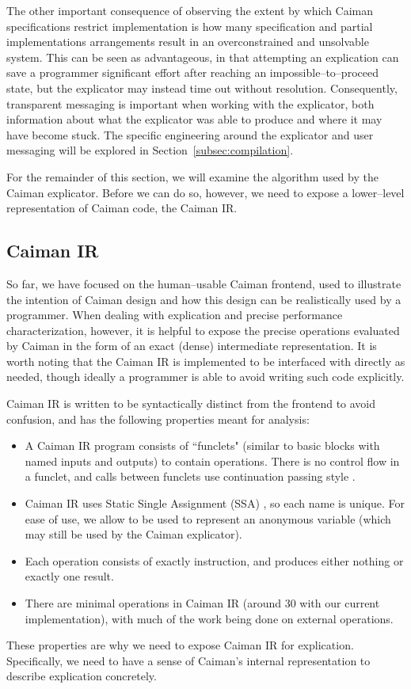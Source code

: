 The other important consequence of observing the extent by which Caiman specifications restrict implementation is how many specification and partial implementations arrangements result in an overconstrained and unsolvable system.  This can be seen as advantageous, in that attempting an explication can save a programmer significant effort after reaching an impossible--to--proceed state, but the explicator may instead time out without resolution.  Consequently, transparent messaging is important when working with the explicator, both information about what the explicator was able to produce and where it may have become stuck.  The specific engineering around the explicator and user messaging will be explored in Section~\ref{subsec:compilation}.

For the remainder of this section, we will examine the algorithm used by the Caiman explicator.  Before we can do so, however, we need to expose a lower--level representation of Caiman code, the Caiman IR.

\subsection{Caiman IR}
\label{subsec:ir}

So far, we have focused on the human--usable Caiman frontend, used to illustrate the intention of Caiman design and how this design can be realistically used by a programmer.  When dealing with explication and precise performance characterization, however, it is helpful to expose the precise operations evaluated by Caiman in the form of an exact (dense) intermediate representation.  It is worth noting that the Caiman IR is implemented to be interfaced with directly as needed, though ideally a programmer is able to avoid writing such code explicitly.

Caiman IR is written to be syntactically distinct from the frontend to avoid confusion, and has the following properties meant for analysis:
%
\begin{itemize}
\item A Caiman IR program consists of ``funclets" (similar to basic blocks with named inputs and outputs) to contain operations.  There is no control flow in a funclet, and calls between funclets use continuation passing style .
\item Caiman IR uses Static Single Assignment (SSA) , so each name is unique.  For ease of use, we allow \code{\%_} to be used to represent an anonymous variable (which may still be used by the Caiman explicator).
\item Each operation consists of exactly instruction, and produces either nothing or exactly one result.
\item There are minimal operations in Caiman IR (around 30 with our current implementation), with much of the work being done on external operations.
\end{itemize}
%
These properties are why we need to expose Caiman IR for explication.  Specifically, we need to have a sense of Caiman's internal representation to describe explication concretely.  

